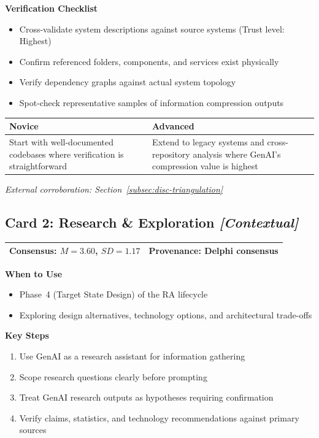 \textbf{Verification Checklist}
\begin{itemize}[label=\checkbox]
    \item Cross-validate system descriptions against source systems (Trust level: Highest)
    \item Confirm referenced folders, components, and services exist physically
    \item Verify dependency graphs against actual system topology
    \item Spot-check representative samples of information compression outputs
\end{itemize}

\begin{tabular}{|p{6.5cm}|p{6.5cm}|}
    \hline
    \textbf{Novice} & \textbf{Advanced} \\
    \hline
    Start with well-documented codebases where verification is straightforward & Extend to legacy systems and cross-repository analysis where GenAI's compression value is highest \\
    \hline
\end{tabular}

\vspace{0.5em}
\textit{External corroboration: Section~\ref{subsec:disc-triangulation}}

\clearpage
\subsection*{Card 2: Research \& Exploration \hfill \textit{[Contextual]}}

\begin{tabular}{|p{7cm}|p{6cm}|}
    \hline
    \textbf{Consensus:} $M = 3.60$, $SD = 1.17$ & \textbf{Provenance:} Delphi consensus \\
    \hline
\end{tabular}

\vspace{0.5em}
\textbf{When to Use}
\begin{itemize}
    \item Phase~4 (Target State Design) of the RA lifecycle
    \item Exploring design alternatives, technology options, and architectural trade-offs
\end{itemize}

\textbf{Key Steps}
\begin{enumerate}
    \item Use GenAI as a research assistant for information gathering
    \item Scope research questions clearly before prompting
    \item Treat GenAI research outputs as hypotheses requiring confirmation
    \item Verify claims, statistics, and technology recommendations against primary sources
\end{enumerate}

